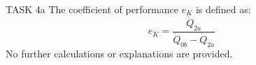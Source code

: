 TASK 4a  
The coefficient of performance \( e_K \) is defined as:  
\[
e_K = \frac{\dot{Q}_{2a}}{\dot{Q}_{0b} - \dot{Q}_{2a}}
\]  
No further calculations or explanations are provided.